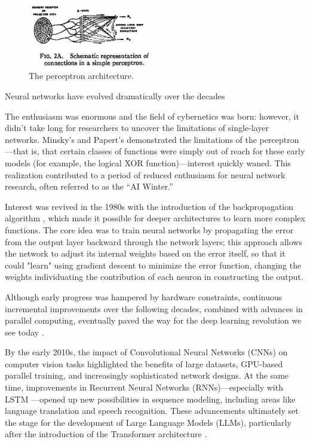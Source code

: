 \begin{figure}[ht]
    \centering
    \includegraphics[width=0.5\textwidth]{images/perceptron.png}
    \caption{The perceptron architecture.}
    \label{fig:perceptron}
\end{figure}

Neural networks have evolved dramatically over the decades

The enthusiasm was enormous and the field of cybernetics was born: however, it didn’t take long for researchers to uncover the limitations of single-layer networks. Minsky's and Papert's demonstrated the limitations of the perceptron—that is, that certain classes of functions were simply out of reach for these early models (for example, the logical XOR function)—interest quickly waned. \cite{minsky1969perceptrons}
This realization contributed to a period of reduced enthusiasm for neural network research, often referred to as the “AI Winter.”

Interest was revived in the 1980s with the introduction of the backpropagation algorithm \cite{rumelhart1986learning}, which made it possible for deeper architectures to learn more complex functions. The core idea was to train neural networks by propagating the error from the output layer backward through the network layers; this approach allows the network to adjust its internal weights based on the error itself, so that it could "learn" using gradient descent to minimize the error function, changing the weights individuating the contribution of each neuron in constructing the output.

Although early progress was hampered by hardware constraints, continuous incremental improvements over the following decades, combined with advances in parallel computing, eventually paved the way for the deep learning revolution we see today \cite{goodfellow2016deep}.

By the early 2010s, the impact of Convolutional Neural Networks (CNNs) on computer vision tasks \cite{krizhevsky2012imagenet} highlighted the benefits of large datasets, GPU-based parallel training, and increasingly sophisticated network designs. At the same time, improvements in Recurrent Neural Networks (RNNs)—especially with LSTM \cite{hochreiter1997long}—opened up new possibilities in sequence modeling, including areas like language translation and speech recognition. These advancements ultimately set the stage for the development of Large Language Models (LLMs), particularly after the introduction of the Transformer architecture \cite{vaswani2017attention}.


